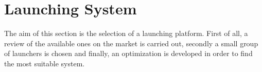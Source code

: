 
%

\section{Launching System}
The aim of this section is the selection of a launching platform. First of all, a review of the available ones on the market is carried out, secondly a small group of launchers is chosen and finally, an optimization is developed in order to find the most suitable system. 
